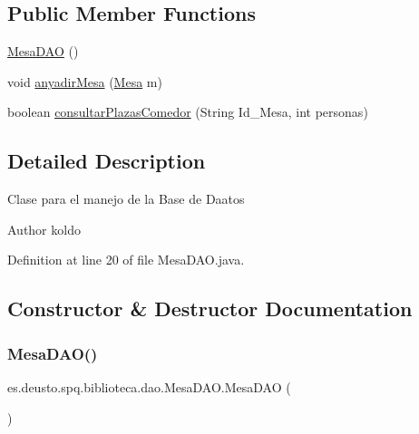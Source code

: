 \subsection*{Public Member Functions}
\begin{DoxyCompactItemize}
\item 
\mbox{\hyperlink{classes_1_1deusto_1_1spq_1_1biblioteca_1_1dao_1_1_mesa_d_a_o_a793689365e4f24ec3f0c16ccde784d86}{Mesa\+D\+AO}} ()
\item 
void \mbox{\hyperlink{classes_1_1deusto_1_1spq_1_1biblioteca_1_1dao_1_1_mesa_d_a_o_aea7e6b72ca52e203015e78fa9f7d3817}{anyadir\+Mesa}} (\mbox{\hyperlink{classes_1_1deusto_1_1spq_1_1biblioteca_1_1data_1_1_mesa}{Mesa}} m)
\item 
boolean \mbox{\hyperlink{classes_1_1deusto_1_1spq_1_1biblioteca_1_1dao_1_1_mesa_d_a_o_a7631ebe9a7d3215db433ac29bb3e75c4}{consultar\+Plazas\+Comedor}} (String Id\+\_\+\+Mesa, int personas)
\end{DoxyCompactItemize}


\subsection{Detailed Description}
Clase para el manejo de la Base de Daatos \begin{DoxyAuthor}{Author}
koldo 
\end{DoxyAuthor}


Definition at line 20 of file Mesa\+D\+A\+O.\+java.



\subsection{Constructor \& Destructor Documentation}
\mbox{\label{classes_1_1deusto_1_1spq_1_1biblioteca_1_1dao_1_1_mesa_d_a_o_a793689365e4f24ec3f0c16ccde784d86}} 
\subsubsection{\texorpdfstring{Mesa\+D\+A\+O()}{MesaDAO()}}
{\footnotesize\ttfamily es.\+deusto.\+spq.\+biblioteca.\+dao.\+Mesa\+D\+A\+O.\+Mesa\+D\+AO (\begin{DoxyParamCaption}{ }\end{DoxyParamCaption})}

